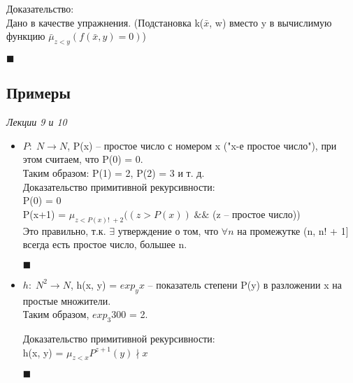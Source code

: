\documentclass{article}
\begin{document}
        Доказательство:\\
        Дано в качестве упражнения. (Подстановка k($\bar x$, w) вместо y в вычислимую функцию $\bar \mu_{z < y} (f(\bar x, y) = 0)$)
        \begin{flushright}
            $\blacksquare$\\
        \end{flushright}
        
    \subsection{Примеры}
    \emph{Лекции 9 и 10}\\
        \begin{itemize}
            \item $P:\; N \rightarrow N$, P(x) -- простое число с номером x ("x-е простое число"), при этом считаем, что P(0) = 0.\\
            Таким образом: P(1) = 2, P(2) = 3 и т. д.\\
            
            Доказательство примитивной рекурсивности:\\
            P(0) = 0\\
            P(x+1) = $\mu_{z < P(x)!\; + 2}((z > P(x))\; \&\& $  (z -- простое число))\\
            Это правильно, т.к. $\exists$ утверждение о том, что $\forall n $ на промежутке (n, n! + 1] всегда есть простое число, большее n.
            \begin{flushright}
                $\blacksquare$\\
            \end{flushright}
            
            \item $h:\; N^{2} \rightarrow N$, h(x, y) = $exp_y x$ -- показатель степени P(y) в разложении x на простые множители. \\
            Таким образом, $exp_3 300$ = 2.
            
            Доказательство примитивной рекурсивности:\\
            h(x, y) = $\mu_{z < x} P^{z+1}(y) \nmid x $
            \begin{flushright}
                $\blacksquare$\\
            \end{flushright}
        \end{itemize}
        
\end{document}
